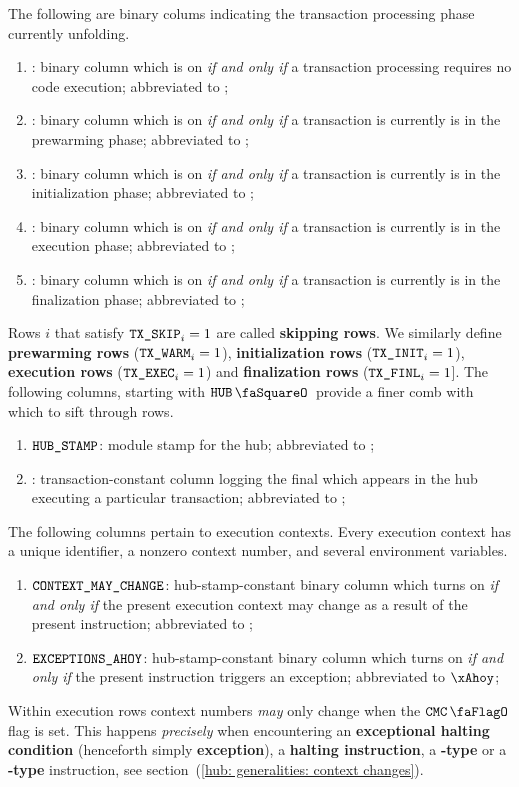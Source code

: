 \noindent The following are binary colums indicating the transaction processing phase currently unfolding.
\begin{enumerate}[resume]
	\item \TXSKIP{}:
		binary column which is on \emph{if and only if} a transaction processing requires no code execution; abbreviated to \txSkip{};
	\item \TXWARM{}:
		binary column which is on \emph{if and only if} a transaction is currently is in the prewarming phase; abbreviated to \txWarm{};
	\item \TXINIT{}:
		binary column which is on \emph{if and only if} a transaction is currently is in the initialization phase; abbreviated to \txInit{};
	\item \TXEXEC{}:
		binary column which is on \emph{if and only if} a transaction is currently is in the execution phase; abbreviated to \txExec{};
	\item \TXFINL{}:
		binary column which is on \emph{if and only if} a transaction is currently is in the finalization phase; abbreviated to \txFinl{};
\end{enumerate}
Rows $i$ that satisfy $\texttt{TX}\texttt{\_SKIP}_{i} = 1$ are called \textbf{skipping rows}. We similarly define
\textbf{prewarming rows} ($\texttt{TX}\texttt{\_WARM}_{i} = 1$),
\textbf{initialization rows} ($\texttt{TX}\texttt{\_INIT}_{i} = 1$),
\textbf{execution rows} ($\texttt{TX}\texttt{\_EXEC}_{i} = 1$) and
\textbf{finalization rows} ($\texttt{TX}\texttt{\_FINL}_{i} = 1$].
The following columns, starting with $\hubStamp$ provide a finer comb with which to sift through rows. 
\begin{enumerate}[resume]
	\item $\texttt{HUB\_STAMP}$: module stamp for the hub; abbreviated to \hubStamp{};
	\item \TXENDSTAMP{}: transaction-constant column logging the final \hubStamp{} which appears in the hub executing a particular transaction; abbreviated to \txEndStamp{};
\end{enumerate}
The following columns pertain to execution contexts. Every execution context has a unique identifier, a nonzero context number, and several environment variables. 
\begin{enumerate}[resume]
	\item $\texttt{CONTEXT\_MAY\_CHANGE}$:
		hub-stamp-constant binary column which turns on \emph{if and only if} the present execution context may change as a result of the present instruction; abbreviated to \cmc{};
	\item $\texttt{EXCEPTIONS\_AHOY}$:
		hub-stamp-constant binary column which turns on \emph{if and only if} the present instruction triggers an exception; abbreviated to $\xAhoy$;
\end{enumerate}
Within execution rows context numbers \emph{may} only change when the $\cmc$ flag is set.
This happens \emph{precisely} when encountering
an \textbf{exceptional halting condition} (henceforth simply \textbf{exception}),
a \textbf{halting instruction},
a \textbf{-type} or
a \textbf{-type} instruction, see section~(\ref{hub: generalities: context changes}).

